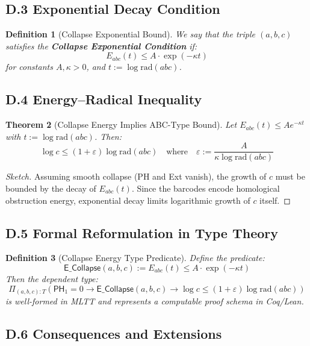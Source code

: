 \documentclass[11pt]{article}
\newtheorem{theorem}{Theorem}[section]
\newtheorem{definition}[theorem]{Definition}
\begin{document}
\subsection*{D.3 Exponential Decay Condition}

\begin{definition}[Collapse Exponential Bound]
We say that the triple \( (a,b,c) \) satisfies the \textbf{Collapse Exponential Condition} if:
\[
E_{abc}(t) \leq A \cdot \exp(-\kappa t)
\]
for constants \( A, \kappa > 0 \), and \( t := \log \mathrm{rad}(abc) \).
\end{definition}

\subsection*{D.4 Energy–Radical Inequality}

\begin{theorem}[Collapse Energy Implies ABC-Type Bound]
Let \( E_{abc}(t) \leq A e^{-\kappa t} \) with \( t := \log \mathrm{rad}(abc) \).  
Then:
\[
\log c \leq (1 + \varepsilon) \log \mathrm{rad}(abc)
\quad \text{where} \quad
\varepsilon := \frac{A}{\kappa \log \mathrm{rad}(abc)}
\]
\end{theorem}

\begin{proof}[Sketch]
Assuming smooth collapse (PH and Ext vanish), the growth of \( c \) must be bounded by the decay of \( E_{abc}(t) \).  
Since the barcodes encode homological obstruction energy, exponential decay limits logarithmic growth of \( c \) itself.
\end{proof}

\subsection*{D.5 Formal Reformulation in Type Theory}

\begin{definition}[Collapse Energy Type Predicate]
Define the predicate:
\[
\mathsf{E\_Collapse}(a,b,c) := E_{abc}(t) \leq A \cdot \exp(-\kappa t)
\]
Then the dependent type:
\[
\Pi_{(a,b,c):T} \left( \mathsf{PH}_1 = 0 \to \mathsf{E\_Collapse}(a,b,c) \to \log c \leq (1+\varepsilon) \log \mathrm{rad}(abc) \right)
\]
is well-formed in MLTT and represents a computable proof schema in Coq/Lean.
\end{definition}

\subsection*{D.6 Consequences and Extensions}
\end{document}
